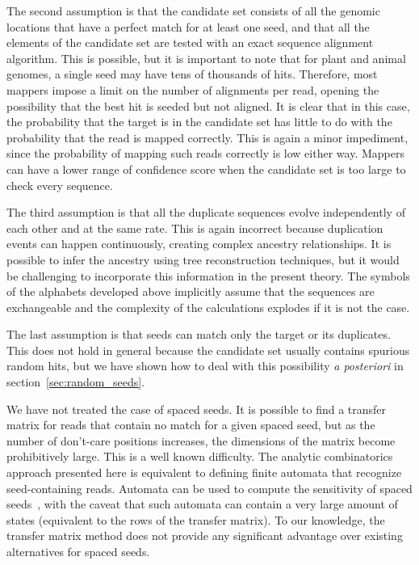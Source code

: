 \documentclass{article}
\begin{document}
The second assumption is that the candidate set consists of all the
genomic locations that have a perfect match for at least one seed, and
that all the elements of the candidate set are tested with an exact
sequence alignment algorithm. This is possible, but it is important to
note that for plant and animal genomes, a single seed may have tens of
thousands of hits. Therefore, most mappers impose a limit on the number of
alignments per read, opening the possibility that the best hit is seeded
but not aligned. It is clear that in this case, the probability that the
target is in the candidate set has little to do with the probability that
the read is mapped correctly. This is again a minor impediment, since the
probability of mapping such reads correctly is low either way. Mappers can
have a lower range of confidence score when the candidate set is too
large to check every sequence.

The third assumption is that all the duplicate sequences evolve
independently of each other and at the same rate. This is again incorrect
because duplication events can happen continuously, creating complex
ancestry relationships. It is possible to infer the ancestry using tree
reconstruction techniques, but it would be challenging to incorporate this
information in the present theory. The symbols of the alphabets developed
above implicitly assume that the sequences are exchangeable and the
complexity of the calculations explodes if it is not the case.

The last assumption is that seeds can match only the target or its
duplicates. This does not hold in general because the candidate set
usually contains spurious random hits, but we have shown how to deal with
this possibility \textit{a posteriori} in section~\ref{sec:random_seeds}.

We have not treated the case of spaced seeds. It is possible to find a
transfer matrix for reads that contain no match for a given spaced seed,
but as the number of don't-care positions increases, the dimensions of the
matrix become prohibitively large. This is a well known difficulty. The
analytic combinatorics approach presented here is equivalent to defining
finite automata that recognize seed-containing reads. Automata can be used
to compute the sensitivity of spaced seeds~\cite{kucherov2005multiseed,
buhler2005designing}, with the caveat that such automata can contain a
very large amount of states (equivalent to the rows of the transfer
matrix). To our knowledge, the transfer matrix method does not provide any
significant advantage over existing alternatives for spaced seeds.
\end{document}
